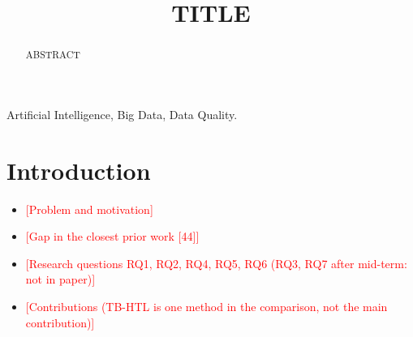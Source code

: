 \documentclass[conference]{IEEEtran}
\newcommand{\todoSV}[1]{\textcolor{red}{[#1]}}
\begin{document}
\title{TITLE}

\author{
    \IEEEauthorblockN{\todoSV{Authors -- approved by supervisor}}
}

\maketitle

\begin{abstract}
ABSTRACT
\end{abstract}

\begin{IEEEkeywords}
Artificial Intelligence, Big Data, Data Quality.
\end{IEEEkeywords}

\section{Introduction}  %
\begin{itemize}
  \item \todoSV{Problem and motivation}
  \item \todoSV{Gap in the closest prior work [44]}
  \item \todoSV{Research questions RQ1, RQ2, RQ4, RQ5, RQ6 (RQ3, RQ7 after mid-term: not in paper)}
  \item \todoSV{Contributions (TB-HTL is one method in the comparison, not the main contribution)}
\end{itemize}

\end{document}
